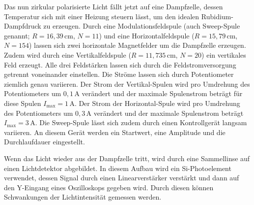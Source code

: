 Das nun zirkular polarisierte Licht fällt jetzt auf eine Dampfzelle, dessen Temperatur sich mit einer Heizung steuern lässt, um den idealen Rubidium-Dampfdruck zu erzeugen.
Durch eine Modulationsfeldspule (auch Sweep-Spule genannt; $R=16,39\,\text{cm}$, $N=11$) und eine Horizontalfeldspule ($R=15,79\,\text{cm}$, $N=154$) lassen sich zwei horizontale Magnetfelder um die Dampfzelle erzeugen. Zudem wird durch eine Vertikalfeldspule ($R=11,735\,\text{cm}$, $N=20$) ein vertikales Feld erzeugt. Alle drei Feldstärken lassen sich durch die Feldstromversorgung getrennt voneinander einstellen. Die Ströme lassen sich durch Potentiometer ziemlich genau variieren. Der Strom der Vertikal-Spulen wird pro Umdrehung des Potentiometers um $0,1\,\text{A}$ verändert und der maximale Spulenstrom beträgt für diese Spulen $I_\text{max}=1\,\text{A}$.  Der Strom der Horizontal-Spule wird pro Umdrehung des Potentiometers um $0,3\,\text{A}$ verändert und der maximale Spulenstrom beträgt  $I_\text{max}=3\,\text{A}$.
Die Sweep-Spule lässt sich zudem durch einen Kontrollgerät langsam variieren. An diesem Gerät werden ein Startwert, eine Amplitude und die Durchlaufdauer eingestellt.

Wenn das Licht wieder aus der Dampfzelle tritt, wird durch eine Sammellinse auf einen Lichtdetektor abgebildet. In diesem Aufbau wird ein Si-Photoelement verwendet, dessen Signal durch einen Linearverstärker verstärkt und dann auf den Y-Eingang eines Oszilloskops gegeben wird. Durch diesen können Schwankungen der Lichtintensität gemessen werden.
 
